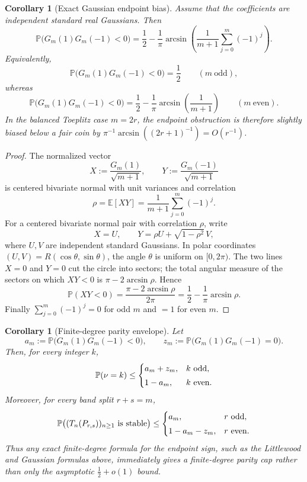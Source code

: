 \documentclass[11pt]{article}
\newtheorem{corollary}[theorem]{Corollary}
\newcommand{\E}{\mathbb{E}}
\newcommand{\PP}{\mathbb{P}}
\begin{document}
\begin{corollary}[Exact Gaussian endpoint bias]\label{cor:gaussian-endpoint}
Assume that the coefficients are independent standard real Gaussians.  Then
\[
\PP\bigl(G_m(1)G_m(-1)<0\bigr)
=\frac12-\frac1\pi
  \arcsin\!\left(\frac{1}{m+1}\sum_{j=0}^{m}(-1)^j\right).
\]
Equivalently,
\[
\PP\bigl(G_m(1)G_m(-1)<0\bigr)=\frac12
\qquad(m\ \text{odd}),
\]
whereas
\[
\PP\bigl(G_m(1)G_m(-1)<0\bigr)
=\frac12-\frac1\pi\arcsin\!\left(\frac1{m+1}\right)
\qquad(m\ \text{even}).
\]
In the balanced Toeplitz case \(m=2r\), the endpoint obstruction is therefore
slightly biased below a fair coin by
\(\pi^{-1}\arcsin((2r+1)^{-1})=O(r^{-1})\).
\end{corollary}

\begin{proof}
The normalized vector
\[
X:=\frac{G_m(1)}{\sqrt{m+1}},
\qquad
Y:=\frac{G_m(-1)}{\sqrt{m+1}}
\]
is centered bivariate normal with unit variances and correlation
\[
\rho=\E[XY]=\frac{1}{m+1}\sum_{j=0}^{m}(-1)^j .
\]
For a centered bivariate normal pair with correlation \(\rho\), write
\[
X=U,\qquad Y=\rho U+\sqrt{1-\rho^2}\,V,
\]
where \(U,V\) are independent standard Gaussians.  In polar coordinates
\((U,V)=R(\cos\theta,\sin\theta)\), the angle \(\theta\) is uniform on
\([0,2\pi)\).  The two lines \(X=0\) and \(Y=0\) cut the circle into sectors;
the total angular measure of the sectors on which \(XY<0\) is
\(\pi-2\arcsin\rho\).  Hence
\[
\PP(XY<0)=\frac{\pi-2\arcsin\rho}{2\pi}
=\frac12-\frac1\pi\arcsin\rho .
\]
Finally \(\sum_{j=0}^m(-1)^j=0\) for odd \(m\) and \(=1\) for even \(m\).
\end{proof}

\begin{corollary}[Finite-degree parity envelope]\label{cor:finite-envelope}
Let
\[
a_m:=\PP\bigl(G_m(1)G_m(-1)<0\bigr),
\qquad
z_m:=\PP\bigl(G_m(1)G_m(-1)=0\bigr).
\]
Then, for every integer \(k\),
\[
\PP(\nu=k)\le
\begin{cases}
a_m+z_m,& k\ {\rm odd},\\[1mm]
1-a_m,& k\ {\rm even}.
\end{cases}
\]
Moreover, for every band split \(r+s=m\),
\[
\PP\bigl((T_n(P_{r,s}))_{n\ge1}\ {\rm is\ stable}\bigr)
\le
\begin{cases}
a_m,& r\ {\rm odd},\\[1mm]
1-a_m-z_m,& r\ {\rm even}.
\end{cases}
\]
Thus any exact finite-degree formula for the endpoint sign, such as the
Littlewood and Gaussian formulas above, immediately gives a finite-degree
parity cap rather than only the asymptotic \(\tfrac12+o(1)\) bound.
\end{corollary}
\end{document}
